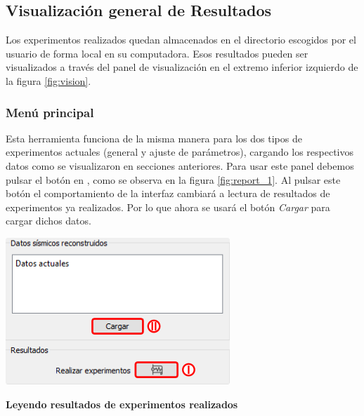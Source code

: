 \documentclass[12pt,twoside,letter]{ol-softwaremanual}
\newcommand*\circled[1]{\tikz[baseline=(char.base)]{
            \node[shape=circle,draw,inner sep=2pt] (char) {#1};}}
\newenvironment{Figure}
  {\par\medskip\noindent\minipage{\linewidth}}
  {\endminipage\par\medskip}
\begin{document}
\subsection{Visualización general de Resultados}

Los experimentos realizados quedan almacenados en el directorio escogidos por el usuario de forma local en su computadora. Esos resultados pueden ser visualizados a través del panel de visualización \circled{6} en el extremo inferior izquierdo de la figura \ref{fig:vision}.

\subsubsection{Menú principal}

\begin{multicols}{2}

Esta herramienta funciona de la misma manera para los dos tipos de experimentos actuales (general y ajuste de parámetros), cargando los respectivos datos como se visualizaron en secciones anteriores. Para usar este panel debemos pulsar el botón en \circled{1}, como se observa en la figura \ref{fig:report_1}. Al pulsar este botón el comportamiento de la interfaz cambiará a lectura de resultados de experimentos ya realizados. Por lo que ahora se usará el botón \emph{Cargar} \circled{2} para cargar dichos datos.

\begin{Figure}
    \centering
    \includegraphics[width=0.8\linewidth]{report-1.png}
    \label{fig:report_1}
\end{Figure}

\end{multicols}

\textbf{Leyendo resultados de experimentos realizados}
\end{document}
